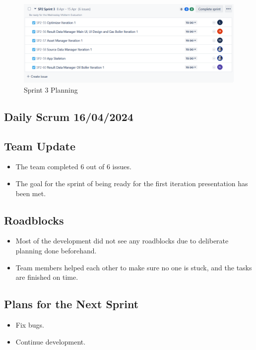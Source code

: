 \documentclass[12pt]{report}
\begin{document}
\begin{figure}[H]
  \centering
  \includegraphics[width=1\textwidth]{Resources/3-Sprint/Planning/Sprint3Planning.png}
  \caption{Sprint 3 Planning}
  \label{fig:S3Planning-image}
\end{figure}
\clearpage

\subsection*{Daily Scrum 16/04/2024}
\subsection*{Team Update}
\begin{itemize}
    \item The team completed 6 out of 6 issues.
    \item The goal for the sprint of being ready for the first iteration presentation has been met.
\end{itemize}

\subsection*{Roadblocks}
\begin{itemize}
    \item Most of the development did not see any roadblocks due to deliberate planning done beforehand.
    \item Team members helped each other to make sure no one is stuck, and the tasks are finished on time.
\end{itemize}

\subsection*{Plans for the Next Sprint}
\begin{itemize}
    \item Fix bugs.
    \item Continue development.
\end{itemize}
\end{document}
